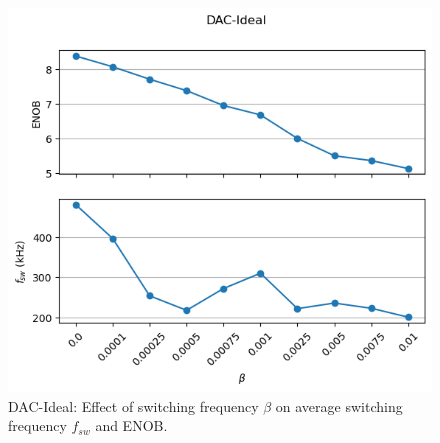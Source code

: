 \documentclass[a4paper]{article}
\begin{document}


\begin{figure}[!h]
	\centering
	\begin{minipage}{0.45\linewidth}
		\centering
		\includegraphics[scale = 0.55]{switch_plots/dac_ideal.png}
		\caption{DAC-Ideal: Effect of switching frequency $\beta$ on average switching frequency $f_{sw}$ and ENOB.}
        \label{fig:fmin_dacideal}
	\end{minipage}
	\hfil
	\begin{minipage}{0.45\linewidth}
		\centering

\end{minipage}
\end{figure}
\end{document}
